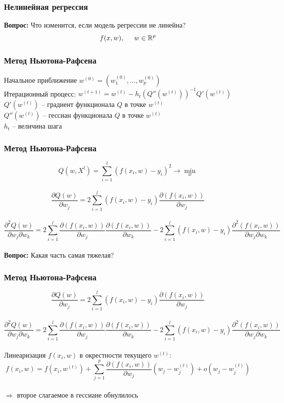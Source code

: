 \documentclass[10pt]{beamer}
\begin{document}
\begin{frame}\frametitle{Нелинейная регрессия}
	\textbf{Вопрос:} Что изменится, если модель регрессии не линейна?\\
	\bigbreak
	$$f(x, w), \hspace{5mm} w \in \mathbb{R}^p$$
\end{frame}

\begin{frame}\frametitle{Метод Ньютона-Рафсена}
	Начальное приближение $w^{(0)} = (w_1^{(0)}, \dots, w_p^{(0)})$\\
	Итерационный процесс: $w^{(t+1)} = w^{(t)} - h_t (Q''(w^{(t)}))^{-1}Q'(w^{(t)})$\\
	\bigbreak
	$Q'(w^{(t)})$ -- градиент функционала $Q$ в точке $w^{(t)}$\\
	$Q''(w^{(t)})$ -- гессиан функционала $Q$ в точке $w^{(t)}$\\
	$h_t$ -- величина шага
\end{frame}

\begin{frame}\frametitle{Метод Ньютона-Рафсена}
	$$Q(w,X^l) = \sum\limits_{i=1}^l (f (x_i, w) - y_i)^2 \rightarrow \min\limits_{w}$$\\
	
	$$\frac{\partial Q(w)}{\partial w_j} = 2 \sum\limits_{i=1}^l (f(x_i, w) - y_i ) \frac{\partial(f(x_i, w))}{\partial w_j}$$\\
	$$\frac{\partial^2 Q(w)}{\partial w_j \partial w_k} = 2 \sum\limits_{i=1}^l \frac{\partial(f(x_i, w))}{\partial w_j} \frac{\partial(f(x_i, w))}{\partial w_k} - 2 \sum\limits_{i=1}^l (f(x_i, w) - y_i ) \frac{\partial^2 (f(x_i, w))}{\partial w_j \partial w_k}$$\\
	\bigbreak
	\textbf{Вопрос:} Какая часть самая тяжелая?
\end{frame}

\begin{frame}\frametitle{Метод Ньютона-Рафсена}
	$$\frac{\partial Q(w)}{\partial w_j} = 2 \sum\limits_{i=1}^l (f(x_i, w) - y_i ) \frac{\partial(f(x_i, w))}{\partial w_j}$$\\
	$$\frac{\partial^2 Q(w)}{\partial w_j \partial w_k} = 2 \sum\limits_{i=1}^l \frac{\partial(f(x_i, w))}{\partial w_j} \frac{\partial(f(x_i, w))}{\partial w_k} - 2 \sum\limits_{i=1}^l (f(x_i, w) - y_i ) \frac{\partial^2 (f(x_i, w))}{\partial w_j \partial w_k}$$\\
	\bigbreak
	Линеаризация $f(x_i, w)$ в окрестности текущего $w^{(t)}$:\\
	$$f(x_i, w) = f(x_i, w^{(t)}) + \sum\limits_{j=1}^p \frac{\partial(f(x_i, w))}{\partial w_j} (w_j - w_j^{(t)}) + o(w_j -w_j^{(t)})$$\\
	$\Rightarrow$ второе слагаемое в гессиане обнулилось
\end{frame}
\end{document}
